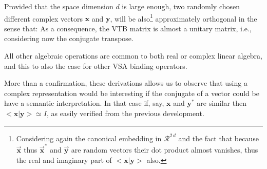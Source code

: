Provided that the space dimension $d$ is large enough, two randomly chosen different complex vectors $\mathbf{x}$ and $\mathbf{y}$, will be also\footnote{
Considering again the canonical embedding in ${\mathcal R}^{2\,d}$ and the fact that
because $\overrightarrow{\mathbf{x}}$ thus $\overrightarrow{\mathbf{x}}^*$ and $\overrightarrow{\mathbf{y}}$ are random vectors their dot product almost vanishes, thus the real and imaginary part of $<\mathbf{x} | \mathbf{y}>$ also.} approximately orthogonal in the sense that:
As a consequence, the VTB matrix is almost a unitary matrix, i.e., 
considering now the conjugate transpose.

All other algebraic operations are common to both real or complex linear algebra, and this to also the case for other VSA binding operators.

More than a confirmation, these derivations allows us to observe that using a complex representation would be interesting if the conjugate of a vector could be have a semantic interpretation. In that case if, say, $\mathbf{x}$ and $\mathbf{y}^*$ are similar then $<\mathbf{x} | \mathbf{y}> \simeq I$, as easily verified from the previous development. 

